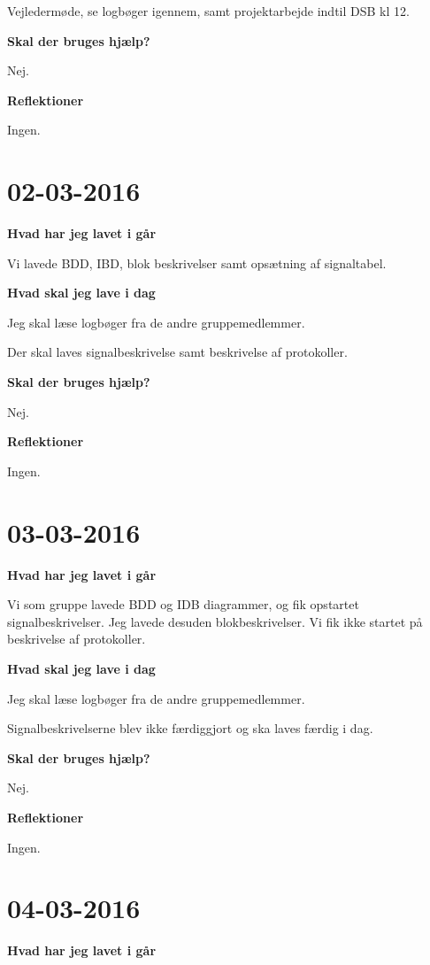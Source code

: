\documentclass{article}
\begin{document}
	Vejledermøde, se logbøger igennem, samt projektarbejde indtil DSB kl 12.
	
	\textbf{Skal der bruges hjælp?}
	
	Nej.
	
	\textbf{Reflektioner}
	
	Ingen.
		
	\section{02-03-2016}
	
	\textbf{Hvad har jeg lavet i går}
	
	Vi lavede BDD, IBD, blok beskrivelser samt opsætning af signaltabel.
	
	\textbf{Hvad skal jeg lave i dag}
	
	Jeg skal læse logbøger fra de andre gruppemedlemmer.
	
	Der skal laves signalbeskrivelse samt beskrivelse af protokoller.
	
	\textbf{Skal der bruges hjælp?}
	
	Nej.
	
	\textbf{Reflektioner}
	
	Ingen.
	
	\section{03-03-2016}
	
	\textbf{Hvad har jeg lavet i går}
	
	Vi som gruppe lavede BDD og IDB diagrammer, og fik opstartet signalbeskrivelser. Jeg lavede desuden blokbeskrivelser. Vi fik ikke startet på beskrivelse af protokoller.
	
	\textbf{Hvad skal jeg lave i dag}

	Jeg skal læse logbøger fra de andre gruppemedlemmer.
	
	Signalbeskrivelserne blev ikke færdiggjort og ska laves færdig i dag.
	
	\textbf{Skal der bruges hjælp?}
	
	Nej.
	
	\textbf{Reflektioner}
	
	Ingen.

	\section{04-03-2016}
	
	\textbf{Hvad har jeg lavet i går}
	
\end{document}
